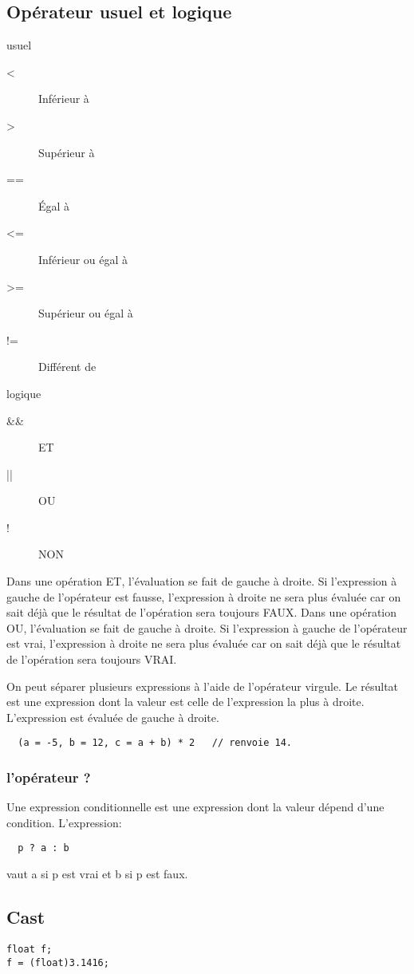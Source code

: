 \documentclass[a4paper]{article}
\begin{document}
\subsection{Opérateur usuel et logique}
usuel
\begin{description}
  \item [<] 	Inférieur à
  \item [>] 	Supérieur à
  \item [==] 	Égal à
  \item [<=] 	Inférieur ou égal à
  \item [>=] 	Supérieur ou égal à
  \item [!=] 	Différent de
\end{description}
logique
\begin{description}
  \item [\&\&] ET
  \item [||] OU
  \item [!] NON
\end{description}
Dans une opération ET, l'évaluation se fait de gauche à droite. Si l'expression à gauche de l'opérateur est fausse, l'expression à droite ne sera plus évaluée car on sait déjà que le résultat de l'opération sera toujours FAUX.\newline
Dans une opération OU, l'évaluation se fait de gauche à droite. Si l'expression à gauche de l'opérateur est vrai, l'expression à droite ne sera plus évaluée car on sait déjà que le résultat de l'opération sera toujours VRAI.


On peut séparer plusieurs expressions à l'aide de l'opérateur virgule. Le résultat est une expression dont la valeur est celle de l'expression la plus à droite. L'expression est évaluée de gauche à droite.
\begin{lstlisting}
  (a = -5, b = 12, c = a + b) * 2   // renvoie 14.
\end{lstlisting}
\subsubsection{l'opérateur \guillemotleft{}?\guillemotright{}}
Une expression conditionnelle est une expression dont la valeur dépend d'une condition. L'expression:
\begin{lstlisting}
  p ? a : b
\end{lstlisting}
vaut a si p est vrai et b si p est faux.
\subsection{Cast}
\begin{lstlisting}
float f;
f = (float)3.1416;
\end{lstlisting}
\end{document}
